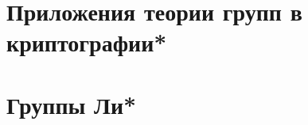 \documentclass[a4paper, 14pt]{extarticle}
\newcommand{\n}{\par}
\newcommand{\im}{\mathrm{Im} \,}
\renewcommand{\phi}{\varphi}
\theoremstyle{definition}
\newtheorem*{exmpl*}{\textit{Пример}}
\theoremstyle{plain}
\numberwithin{theorem}{section}
\numberwithin{definition}{section}
\numberwithin{statement}{section}
\numberwithin{lemma}{section}
\numberwithin{consequence}{section}
\begin{document}
\begin{comment}
		\begin{equation*}
			R/\ker \phi \cong \im \phi.
		\end{equation*}
	\end{theorem*}
	\begin{proof}
		Пусть ${I = \ker \phi.}$ Тогда из доказательства теоремы о гомоморфизме для групп отображение ${\psi: R/I \rightarrow \im \phi, \ \psi(a + I) = \phi(a)}$ является изоморфизмом групп по сложению.\n
		Остаётся проверить, что $\psi$~--- гомоморфизм колец:
		\begin{equation*}
			\psi((a + I)(b + I)) = \psi(ab + I) = \phi(ab) = \phi(a)\phi(b) = \psi(a + I)\psi(b + I). \qedhere
		\end{equation*}
	\end{proof}
	\begin{exmpl*}
		Пусть $K$~--- поле, ${a \in K, \quad \phi: K[x] \rightarrow K, \quad f \mapsto f(a).}$ \n
		Это гомоморфизм, он сюръективен ${(b = \phi(b)).}$ \n
		$\ker \phi = (x - a) \Longrightarrow K[x]/(x - a) \cong K.$
	\end{exmpl*}
    \end{comment}
    \newpage
    \section{Приложения теории групп в криптографии*}
    \setcounter{definition}{0}
    \newpage
    \section{Группы Ли*}
    \setcounter{definition}{0}
    \newpage
\end{document}
